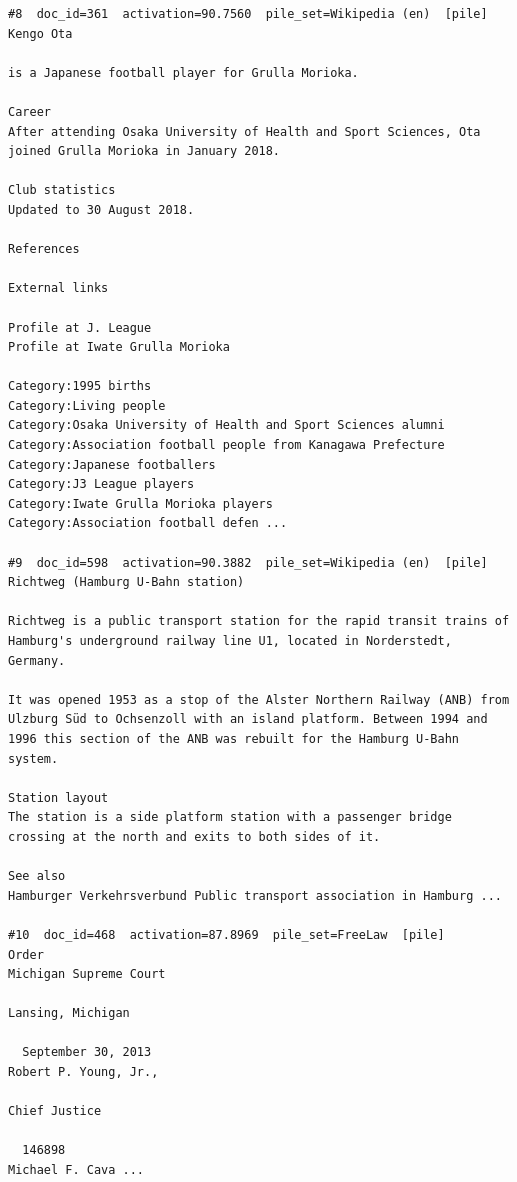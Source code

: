 \begin{verbatim}
#8  doc_id=361  activation=90.7560  pile_set=Wikipedia (en)  [pile]
Kengo Ota

is a Japanese football player for Grulla Morioka.

Career
After attending Osaka University of Health and Sport Sciences, Ota joined Grulla Morioka in January 2018.

Club statistics
Updated to 30 August 2018.

References

External links

Profile at J. League
Profile at Iwate Grulla Morioka

Category:1995 births
Category:Living people
Category:Osaka University of Health and Sport Sciences alumni
Category:Association football people from Kanagawa Prefecture
Category:Japanese footballers
Category:J3 League players
Category:Iwate Grulla Morioka players
Category:Association football defen ...

#9  doc_id=598  activation=90.3882  pile_set=Wikipedia (en)  [pile]
Richtweg (Hamburg U-Bahn station)

Richtweg is a public transport station for the rapid transit trains of Hamburg's underground railway line U1, located in Norderstedt, Germany.

It was opened 1953 as a stop of the Alster Northern Railway (ANB) from Ulzburg Süd to Ochsenzoll with an island platform. Between 1994 and 1996 this section of the ANB was rebuilt for the Hamburg U-Bahn system.

Station layout 
The station is a side platform station with a passenger bridge crossing at the north and exits to both sides of it.

See also 
Hamburger Verkehrsverbund Public transport association in Hamburg ...

#10  doc_id=468  activation=87.8969  pile_set=FreeLaw  [pile]
Order                                                                                       Michigan Supreme Court
                                                                                                  Lansing, Michigan

  September 30, 2013                                                                                  Robert P. Young, Jr.,
                                                                                                                Chief Justice

  146898                                                                                              Michael F. Cava ...


\end{verbatim}
